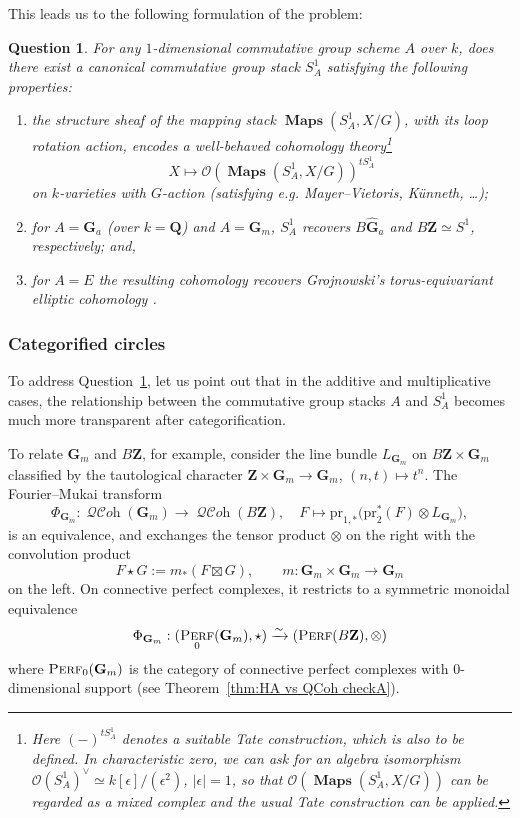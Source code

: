 \documentclass[12pt, oneside]{amsart}
\numberwithin{equation}{section}
\newtheorem{question}[subsubsection]{Question}
\theoremstyle{remark}
\theoremstyle{plain}
\DeclareMathOperator{\QCOH}{\mathcal{QC}\textit{oh}}
\DeclareMathOperator{\Perf}{\textsc{Perf}}
\DeclareMathOperator{\MAP}{\mathbf{Maps}}
\newcommand{\OO}{\mathcal{O}}
\newcommand{\GGhat}{\widehat{\mathbf{G}}}
\newcommand{\GGa}{\mathbf{G}_{a}}
\newcommand{\GGm}{\mathbf{G}_{m}}
\newcommand{\bZ}{\mathbf{Z}}
\newcommand{\bQ}{\mathbf{Q}}
\newcommand{\pr}{\mathrm{pr}}
\begin{document}
This leads us to the following formulation of the problem:

\begin{question}\label{que:intro/S^1}
	For any $1$-dimensional commutative group scheme $A$ over $k$, does there exist a canonical commutative group stack $S^1_A$ satisfying the following properties:
	\begin{enumerate}
		\item the structure sheaf of the mapping stack $\MAP(S^1_A, X/G)$, with its loop rotation action, encodes a well-behaved cohomology theory\footnote{%
		  Here $(-)^{tS^1_A}$ denotes a suitable Tate construction, which is also to be defined.
			In characteristic zero, we can ask for an algebra isomorphism $\OO(S^1_A)^\vee \simeq k[\epsilon]/(\epsilon^2)$, $|\epsilon| = 1$, so that $\OO(\MAP(S^1_A, X/G))$ can be regarded as a mixed complex and the usual Tate construction can be applied.
		} \[ X \mapsto \OO(\MAP(S^1_A, X/G))^{tS^1_A} \] on $k$-varieties with $G$-action (satisfying e.g. Mayer--Vietoris, K\"unneth, \dots);
		\item for $A=\GGa$ (over $k=\bQ$) and $A=\GGm$, $S^1_A$ recovers $B\GGhat_a$ and $B\bZ \simeq S^1$, respectively; and,
		\item for $A=E$ the resulting cohomology recovers Grojnowski's torus-equivariant elliptic cohomology \cite{Gr}.
	\end{enumerate}
\end{question}

\subsubsection{Categorified circles}

To address Question~\ref{que:intro/S^1}, let us point out that in the additive and multiplicative cases, the relationship between the commutative group stacks $A$ and $S^1_A$ becomes much more transparent after categorification.

To relate $\GGm$ and $B\bZ$, for example, consider the line bundle $L_{\GGm}$ on $B\bZ \times \GGm$ classified by the tautological character $\bZ \times \GGm \to \GGm$, $(n,t) \mapsto t^n$.
The Fourier--Mukai transform
\[
  \Phi_{\GGm} : \QCOH(\GGm) \to \QCOH(B\bZ),
  \quad F \mapsto \pr_{1,*}\bigl(\pr_2^*(F) \otimes L_{\GGm}\bigr),
\]
is an equivalence, and exchanges the tensor product $\otimes$ on the right with the convolution product
\[ F \star G := m_*(F \boxtimes G), \qquad m : \GGm \times \GGm \to \GGm \]
on the left.
On connective perfect complexes, it restricts to a symmetric monoidal equivalence
\[ \Phi_{\GGm} : (\Perf_0(\GGm), \star) \xrightarrow{\sim} (\Perf(B\bZ), \otimes) \]
where $\Perf_0(\GGm)$ is the category of connective perfect complexes with $0$-dimensional support (see Theorem~\ref{thm:HA vs QCoh checkA}).
\end{document}
